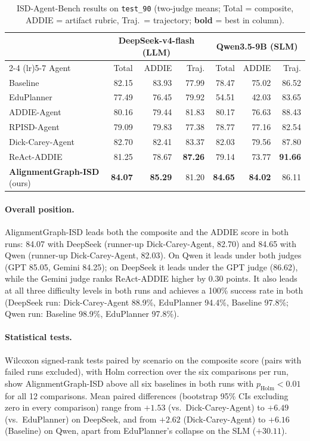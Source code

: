 \begin{table}[t]
  \caption{ISD-Agent-Bench results on \texttt{test\_90} (two-judge means; Total = composite, ADDIE = artifact rubric, Traj.\ = trajectory; \textbf{bold} = best in column).}
  \label{tab:rq1-results}
  \begin{tabular}{@{}lrrrrrr@{}}
    \toprule
    & \multicolumn{3}{c}{DeepSeek-v4-flash (LLM)} & \multicolumn{3}{c}{Qwen3.5-9B (SLM)} \\
    \cmidrule(lr){2-4} \cmidrule(lr){5-7}
    Agent & Total & ADDIE & Traj. & Total & ADDIE & Traj. \\
    \midrule
    Baseline          & 82.15 & 83.93 & 77.99 & 78.47 & 75.02 & 86.52 \\
    EduPlanner        & 77.49 & 76.45 & 79.92 & 54.51 & 42.03 & 83.65 \\
    ADDIE-Agent       & 80.16 & 79.44 & 81.83 & 80.17 & 76.63 & 88.43 \\
    RPISD-Agent       & 79.09 & 79.83 & 77.38 & 78.77 & 77.16 & 82.54 \\
    Dick-Carey-Agent  & 82.70 & 82.41 & 83.37 & 82.03 & 79.56 & 87.80 \\
    ReAct-ADDIE       & 81.25 & 78.67 & \textbf{87.26} & 79.14 & 73.77 & \textbf{91.66} \\
    \textbf{AlignmentGraph-ISD} (ours) & \textbf{84.07} & \textbf{85.29} & 81.20 & \textbf{84.65} & \textbf{84.02} & 86.11 \\
    \bottomrule
  \end{tabular}
\end{table}

\paragraph{Overall position.}
AlignmentGraph-ISD leads both the composite and the ADDIE score in both runs: 84.07 with DeepSeek (runner-up Dick-Carey-Agent, 82.70) and 84.65 with Qwen (runner-up Dick-Carey-Agent, 82.03). On Qwen it leads under both judges (GPT 85.05, Gemini 84.25); on DeepSeek it leads under the GPT judge (86.62), while the Gemini judge ranks ReAct-ADDIE higher by 0.30 points. It also leads at all three difficulty levels in both runs and achieves a 100\% success rate in both (DeepSeek run: Dick-Carey-Agent 88.9\%, EduPlanner 94.4\%, Baseline 97.8\%; Qwen run: Baseline 98.9\%, EduPlanner 97.8\%).

\paragraph{Statistical tests.}
Wilcoxon signed-rank tests paired by scenario on the composite score (pairs with failed runs excluded), with Holm correction over the six comparisons per run, show AlignmentGraph-ISD above all six baselines in both runs with $p_{\mathrm{Holm}} < 0.01$ for all 12 comparisons. Mean paired differences (bootstrap 95\% CIs excluding zero in every comparison) range from $+1.53$ (vs.\ Dick-Carey-Agent) to $+6.49$ (vs.\ EduPlanner) on DeepSeek, and from $+2.62$ (Dick-Carey-Agent) to $+6.16$ (Baseline) on Qwen, apart from EduPlanner's collapse on the SLM ($+30.11$).

